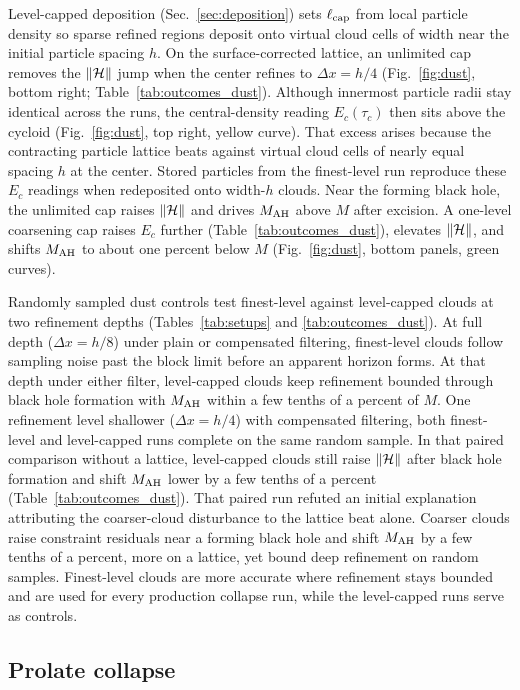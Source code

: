 Level-capped deposition (Sec.~\ref{sec:deposition}) sets $\ell_{\rm cap}$ from local particle density so sparse refined regions deposit onto virtual cloud cells of width near the initial particle spacing $h$. On the surface-corrected lattice, an unlimited cap removes the $\|\mathcal{H}\|$ jump when the center refines to $\Delta x = h/4$ (Fig.~\ref{fig:dust}, bottom right; Table~\ref{tab:outcomes_dust}). Although innermost particle radii stay identical across the runs, the central-density reading $E_c(\tau_c)$ then sits above the cycloid (Fig.~\ref{fig:dust}, top right, yellow curve). That excess arises because the contracting particle lattice beats against virtual cloud cells of nearly equal spacing $h$ at the center. Stored particles from the finest-level run reproduce these $E_c$ readings when redeposited onto width-$h$ clouds. Near the forming black hole, the unlimited cap raises $\|\mathcal{H}\|$ and drives $M_{\rm AH}$ above $M$ after excision. A one-level coarsening cap raises $E_c$ further (Table~\ref{tab:outcomes_dust}), elevates $\|\mathcal{H}\|$, and shifts $M_{\rm AH}$ to about one percent below $M$ (Fig.~\ref{fig:dust}, bottom panels, green curves).

Randomly sampled dust controls test finest-level against level-capped clouds at two refinement depths (Tables~\ref{tab:setups} and \ref{tab:outcomes_dust}). At full depth ($\Delta x = h/8$) under plain or compensated filtering, finest-level clouds follow sampling noise past the block limit before an apparent horizon forms. At that depth under either filter, level-capped clouds keep refinement bounded through black hole formation with $M_{\rm AH}$ within a few tenths of a percent of $M$. One refinement level shallower ($\Delta x = h/4$) with compensated filtering, both finest-level and level-capped runs complete on the same random sample. In that paired comparison without a lattice, level-capped clouds still raise $\|\mathcal{H}\|$ after black hole formation and shift $M_{\rm AH}$ lower by a few tenths of a percent (Table~\ref{tab:outcomes_dust}). That paired run refuted an initial explanation attributing the coarser-cloud disturbance to the lattice beat alone. Coarser clouds raise constraint residuals near a forming black hole and shift $M_{\rm AH}$ by a few tenths of a percent, more on a lattice, yet bound deep refinement on random samples. Finest-level clouds are more accurate where refinement stays bounded and are used for every production collapse run, while the level-capped runs serve as controls.

\subsection{Prolate collapse}\label{sec:prolate}

